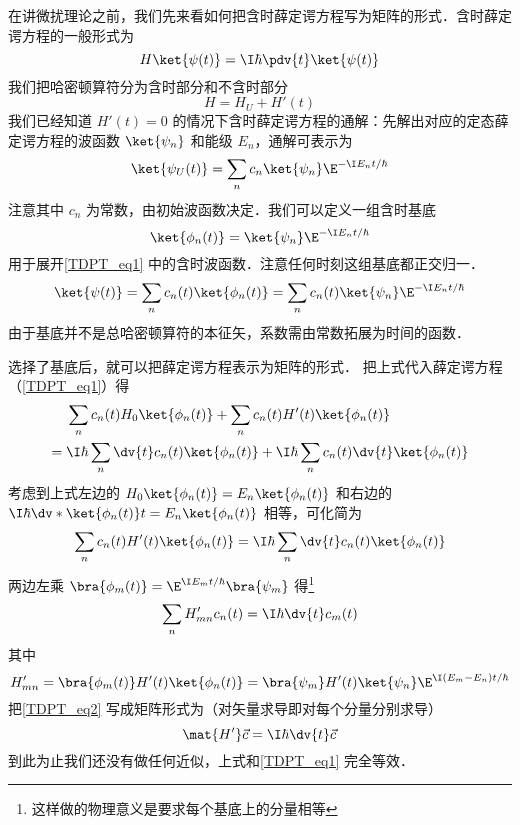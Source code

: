 
在讲微扰理论之前，我们先来看如何把含时薛定谔方程写为矩阵的形式．含时薛定谔方程的一般形式为
\begin{equation}\label{TDPT_eq1}
H \ket{\psi(t)} = \I\hbar \pdv{t} \ket{\psi(t)}
\end{equation}
我们把哈密顿算符分为含时部分和不含时部分
\begin{equation}
H = H_U + H'(t)
\end{equation}
我们已经知道 %
$H'(t) = 0$ 的情况下含时薛定谔方程的通解：先解出对应的定态薛定谔方程的波函数 $\ket{\psi_n}$ 和能级 $E_n$，通解可表示为
\begin{equation}
\ket{\psi_U(t)} = \sum_n c_n \ket{\psi_n} \E^{-\I E_n t/\hbar}
\end{equation}
注意其中 $c_n$ 为常数，由初始波函数决定．我们可以定义一组含时基底
\begin{equation}
\ket{\phi_n(t)} = \ket{\psi_n} \E^{-\I E_n t/\hbar}
\end{equation}
用于展开\autoref{TDPT_eq1} 中的含时波函数．注意任何时刻这组基底都正交归一．
\begin{equation}
\ket{\psi(t)} = \sum_n c_n(t) \ket{\phi_n(t)} = \sum_n c_n(t) \ket{\psi_n} \E^{-\I E_n t/\hbar}
\end{equation}
由于基底并不是总哈密顿算符的本征矢，系数需由常数拓展为时间的函数．

选择了基底后，就可以把薛定谔方程表示为矩阵的形式． %
把上式代入薛定谔方程（\autoref{TDPT_eq1}）得
\begin{equation}\begin{aligned}
&\sum_n c_n(t) H_0 \ket{\phi_n(t)} + \sum_n c_n(t) H'(t) \ket{\phi_n(t)} \\ 
={} &\I\hbar \sum_n \dv{t} c_n(t) \ket{\phi_n(t)}
+ \I\hbar \sum_n c_n(t) \dv{t} \ket{\phi_n(t)}
\end{aligned}\end{equation}
考虑到上式左边的 $H_0\ket{\phi_n(t)} = E_n\ket{\phi_n(t)}$ 和右边的 $\I\hbar \dv*{\ket{\phi_n(t)}}{t} = E_n\ket{\phi_n(t)}$ 相等，可化简为
\begin{equation}
\sum_n c_n(t) H'(t) \ket{\phi_n(t)}
= \I\hbar \sum_n \dv{t} c_n(t) \ket{\phi_n(t)}
\end{equation}
两边左乘 $\bra{\phi_m(t)} = \E^{\I E_m t/\hbar}\bra{\psi_m}$ 得\footnote{这样做的物理意义是要求每个基底上的分量相等} %
\begin{equation}\label{TDPT_eq2}
\sum_n H'_{mn} c_n(t)
= \I\hbar \dv{t} c_m(t)
\end{equation}
其中
\begin{equation}\label{TDPT_eq7}
H'_{mn} = \bra{\phi_m(t)} H'(t) \ket{\phi_n(t)} = \bra{\psi_m} H'(t) \ket{\psi_n} \E^{\I(E_m-E_n)t/\hbar}
\end{equation}
把\autoref{TDPT_eq2} 写成矩阵形式为（对矢量求导即对每个分量分别求导）
\begin{equation}\label{TDPT_eq3}
\mat {H'} \vec c = \I\hbar \dv{t} \vec c
\end{equation}
到此为止我们还没有做任何近似，上式和\autoref{TDPT_eq1} 完全等效．

